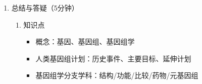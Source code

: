 \documentclass{TIJMUjiaoanLL}
\begin{document}
\begin{enumerate}

  \item 总结与答疑（5分钟）
    \begin{enumerate}
      \item 知识点
	\begin{itemize}
	  \item 概念：基因、基因组、基因组学
	  \item 人类基因组计划：历史事件、主要目标、延伸计划
	  \item 基因组学分支学科：结构/功能/比较/药物/元基因组
	\end{itemize}
    \end{enumerate}
\end{enumerate}

\otherTail
\end{document}
